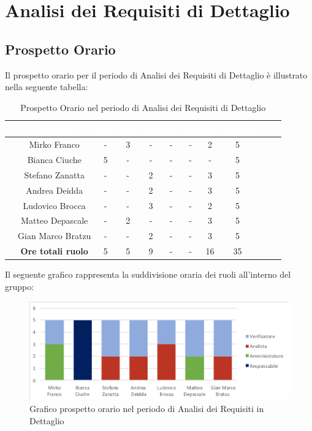 \newpage
\section{Analisi dei Requisiti di Dettaglio}
\subsection{Prospetto Orario}
Il prospetto orario per il periodo di Analisi dei Requisiti di Dettaglio è illustrato nella seguente tabella:

\begin{table}[ht]
	\begin{center}
		\begin{tabular}{cccccccccccc}
			\rowcolor{coolblack}
			\hline 
			& \textcolor{white}{Nome} & \textcolor{white}{Re} & \textcolor{white}{Am} & \textcolor{white}{An} & \textcolor{white}{Pt} &\textcolor{white}{Pr} & \textcolor{white}{Ve} & \textcolor{white}{Totale} \\
			\hline
			
			&Mirko Franco          & - & 3 & - & - & - & 2 &5  \\
			&Bianca Ciuche        & 5  & - & - & - & - & - & 5 \\
			&Stefano Zanatta     & -& - & 2 & - & - & 3&5 \\
			&Andrea Deidda       &  -& - & 2 & - & - & 3 &5 \\
			&Ludovico Brocca    & -& -& 3 & - & - & 2 & 5 \\
			&Matteo Depascale  & -& 2& -& - & - & 3 & 5 \\
			&Gian Marco Bratzu & -& - & 2 & - & - & 3& 5 \\
			\hline
			&\textbf{Ore totali ruolo} & 5 & 5 & 9 & - & - & 16 & 35 \\
		\end{tabular}
		\caption{Prospetto Orario nel periodo di Analisi dei Requisiti di Dettaglio}
	\end{center}
\end{table}

Il seguente grafico rappresenta la suddivisione oraria dei ruoli all'interno del gruppo:
\begin{figure}[!ht]
	\begin{center}
		\includegraphics{images/grafoProspettoOrarioDett.png}
		\caption{Grafico prospetto orario nel periodo di Analisi dei Requisiti in Dettaglio}
	\end{center}
\end{figure}
\newpage

